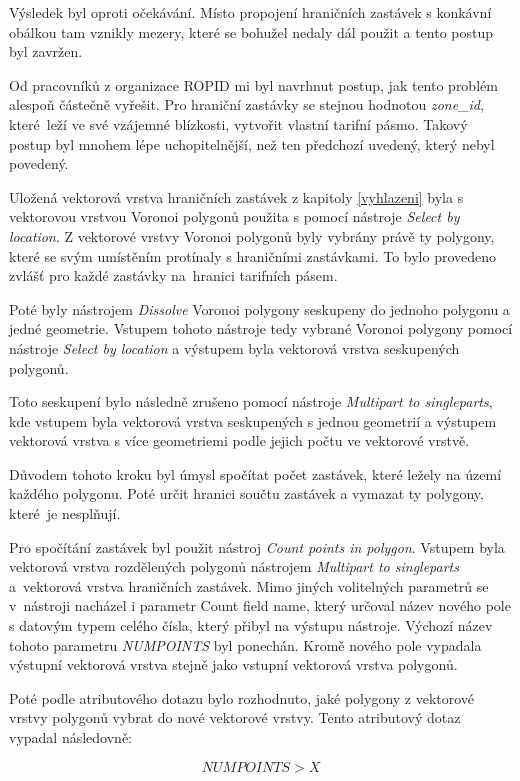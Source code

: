 Výsledek byl oproti očekávání. Místo propojení hraničních zastávek s konkávní obálkou tam vznikly mezery, 
které se bohužel nedaly dál použit a tento postup byl zavržen.

Od pracovníků z organizace ROPID mi byl navrhnut postup, jak tento problém alespoň částečně vyřešit. Pro hraniční zastávky se stejnou hodnotou \textit{zone\_id}, 
které~leží ve své vzájemné blízkosti, vytvořit vlastní tarifní pásmo. Takový postup byl mnohem lépe uchopitelnější, než ten předchozí uvedený, který nebyl povedený.

Uložená vektorová vrstva hraničních zastávek z kapitoly \ref{vyhlazeni} byla s vektorovou vrstvou Voronoi polygonů
použita s pomocí nástroje \textit{Select by location}. Z vektorové vrstvy Voronoi polygonů byly vybrány právě ty polygony,
které se svým umístěním protínaly s hraničními zastávkami. To bylo provedeno zvlášť pro každé zastávky na~hranici tarifních pásem.

Poté byly nástrojem \textit{Dissolve} Voronoi polygony seskupeny do jednoho polygonu a jedné geometrie. Vstupem tohoto nástroje
tedy vybrané Voronoi polygony pomocí nástroje \textit{Select by location} a výstupem byla vektorová vrstva seskupených polygonů.

Toto seskupení bylo následně zrušeno pomocí nástroje \textit{Multipart to singleparts}, kde vstupem byla vektorová vrstva 
seskupených s jednou geometrií a výstupem vektorová vrstva s více geometriemi podle jejich počtu ve vektorové vrstvě.

Důvodem tohoto kroku byl úmysl spočítat počet zastávek, které ležely na území každého polygonu. Poté určit hranici
součtu zastávek a vymazat ty polygony, které~je nesplňují.

Pro spočítání zastávek byl použit nástroj \textit{Count points in polygon}. Vstupem byla vektorová vrstva 
rozdělených polygonů nástrojem \textit{Multipart to singleparts}
a~vektorová vrstva hraničních zastávek. Mimo jiných volitelných parametrů se v~nástroji nacházel i parametr 
Count field name, který určoval název nového pole s datovým typem celého čísla,
který přibyl na výstupu nástroje. Výchozí název tohoto paramet\-ru \textit{NUMPOINTS} byl ponechán. 
Kromě nového pole vypadala vý\-stupní vektorová vrstva stejně jako vstupní vektorová vrstva polygonů.

Poté podle atributového dotazu bylo rozhodnuto, jaké polygony z vektorové vrstvy polygonů vybrat do nové vektorové vrstvy.
Tento atributový dotaz vypadal následovně: 

\[NUMPOINTS > X\]

